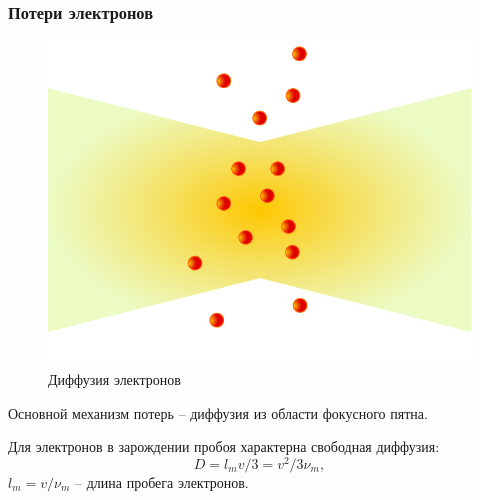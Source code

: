 \documentclass{beamer}
\begin{document}
	\begin{frame}
		\frametitle{Потери электронов}
		
		\begin{figure}
			\centering
			\includegraphics[width=0.5\linewidth]{res/diffusion.png}
			\caption*{Диффузия электронов}
		\end{figure}
		
		Основной механизм потерь -- диффузия из области фокусного пятна.
		
		Для электронов в зарождении пробоя характерна свободная диффузия:
		$$ D = l_m v/3 = v^2/3\nu_m,$$
		$l_m = v / \nu_m$ -- длина пробега электронов.
		
	\end{frame}
\end{document}
